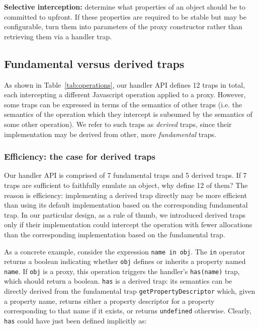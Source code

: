 \documentclass{sig-alternate}
\begin{document}
\textbf{Selective interception:} determine what properties of an object should be to committed to upfront. If these properties are required to be stable but may be configurable, turn them into parameters of the proxy constructor rather than retrieving them via a handler trap.

\subsection{Fundamental versus derived traps}
\label{sub:fundamental_vs_derived_traps}

As shown in Table~\ref{tab:operations}, our handler API defines 12 traps in total, each intercepting a different Javascript operation applied to a proxy. However, some traps can be expressed in terms of the semantics of other traps (i.e. the semantics of the operation which they intercept is subsumed by the semantics of some other operation). We refer to such traps as \emph{derived} traps, since their implementation may be derived from other, more \emph{fundamental} traps.

\subsubsection{Efficiency: the case for derived traps}

Our handler API is comprised of 7 fundamental traps and 5 derived traps. If 7 traps are sufficient to faithfully emulate an object, why define 12 of them? The reason is efficiency: implementing a derived trap directly may be more efficient than using its default implementation based on the corresponding fundamental trap. In our particular design, as a rule of thumb, we introduced derived traps only if their implementation could intercept the operation with fewer allocations than the corresponding implementation based on the fundamental trap.

As a concrete example, consider the expression \texttt{name in obj}. The \texttt{in} operator returns a boolean indicating whether \texttt{obj} defines or inherits a property named \texttt{name}. If \texttt{obj} is a proxy, this operation triggers the handler's \texttt{has(name)} trap, which should return a boolean. \texttt{has} is a derived trap: its semantics can be directly derived from the fundamental trap \texttt{getPropertyDescriptor} which, given a property name, returns either a property descriptor for a property corresponding to that name if it exists, or returns \texttt{undefined} otherwise. Clearly, \texttt{has} could have just been defined implicitly as:
\end{document}
